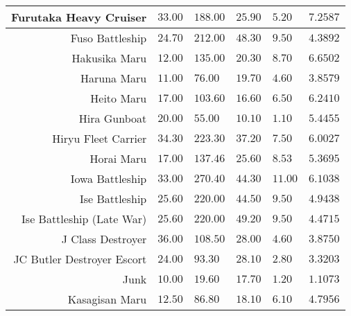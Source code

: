 \documentclass{article}
\begin{document}
\begin{tabularx}{\textwidth}{|r|l|l|l|l|X|}
\hline
Furutaka Heavy Cruiser & $33.00$ & $188.00$ & $25.90$ & $5.20$ & $7.2587$ \\
\hline
Fuso Battleship & $24.70$ & $212.00$ & $48.30$ & $9.50$ & $4.3892$ \\
\hline
Hakusika Maru & $12.00$ & $135.00$ & $20.30$ & $8.70$ & $6.6502$ \\
\hline
Haruna Maru & $11.00$ & $76.00$ & $19.70$ & $4.60$ & $3.8579$ \\
\hline
Heito Maru & $17.00$ & $103.60$ & $16.60$ & $6.50$ & $6.2410$ \\
\hline
Hira Gunboat & $20.00$ & $55.00$ & $10.10$ & $1.10$ & $5.4455$ \\
\hline
Hiryu Fleet Carrier & $34.30$ & $223.30$ & $37.20$ & $7.50$ & $6.0027$ \\
\hline
Horai Maru & $17.00$ & $137.46$ & $25.60$ & $8.53$ & $5.3695$ \\
\hline
Iowa Battleship & $33.00$ & $270.40$ & $44.30$ & $11.00$ & $6.1038$ \\
\hline
Ise Battleship & $25.60$ & $220.00$ & $44.50$ & $9.50$ & $4.9438$ \\
\hline
Ise Battleship (Late War) & $25.60$ & $220.00$ & $49.20$ & $9.50$ & $4.4715$ \\
\hline
J Class Destroyer & $36.00$ & $108.50$ & $28.00$ & $4.60$ & $3.8750$ \\
\hline
JC Butler Destroyer Escort & $24.00$ & $93.30$ & $28.10$ & $2.80$ & $3.3203$ \\
\hline
Junk & $10.00$ & $19.60$ & $17.70$ & $1.20$ & $1.1073$ \\
\hline
Kasagisan Maru & $12.50$ & $86.80$ & $18.10$ & $6.10$ & $4.7956$ \\
\hline
\end{tabularx}
\pagebreak
\end{document}
